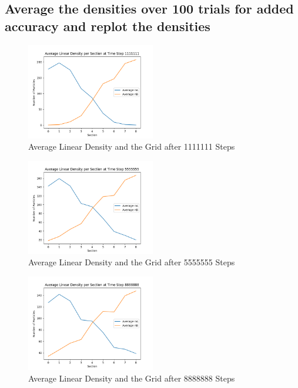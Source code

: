 \documentclass[11pt]{article}
\begin{document}
\subsection{Average the densities over 100 trials for added accuracy and replot the densities}
\begin{figure}[H]
    \centering
    \includegraphics[width=0.5\textwidth, keepaspectratio]{Average_Linear_Density_Grid_After_1111111_Steps_1_Trial.png}
    \caption{Average Linear Density and the Grid after 1111111 Steps}
    \label{fig:27}
\end{figure}

\begin{figure}[H]
    \centering
    \includegraphics[width=0.5\textwidth, keepaspectratio]{Average_Linear_Density_Grid_After_5555555_Steps_1_Trial.png}
    \caption{Average Linear Density and the Grid after 5555555 Steps}
    \label{fig:28}
\end{figure}

\begin{figure}[H]
    \centering
    \includegraphics[width=0.5\textwidth, keepaspectratio]{Average_Linear_Density_Grid_After_8888888_Steps_1_Trial.png}
    \caption{Average Linear Density and the Grid after 8888888 Steps}
    \label{fig:29}
\end{figure}
\end{document}
